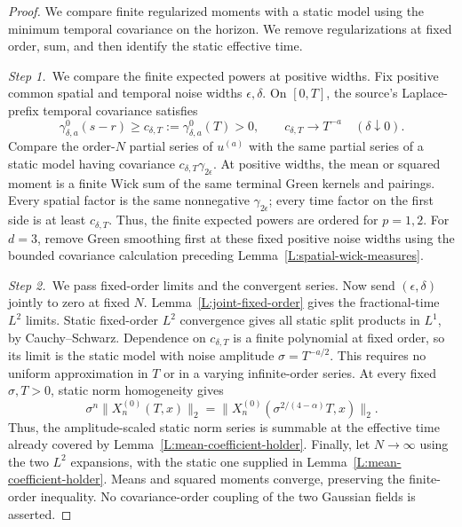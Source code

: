 \documentclass[12pt,oneside,openany]{book}
\numberwithin{equation}{section}
\theoremstyle{nogostyle}
\theoremstyle{definition}
\begin{document}
\begin{proof}
  We compare finite regularized moments with a static model using the minimum
  temporal covariance on the horizon. We remove regularizations at fixed
  order, sum, and then identify the static effective time.


  \medskip
  \noindent\textit{Step 1.~}We compare the finite expected powers at positive
  widths.
  Fix positive common spatial and temporal noise widths $\epsilon,\delta$. On
  $[0,T]$, the source's Laplace-prefix temporal covariance satisfies
  \[
    \gamma_{\delta,a}^0(s-r)\ge c_{\delta,T}:=
    \gamma_{\delta,a}^0(T)>0,\qquad
    c_{\delta,T}\longrightarrow T^{-a}\quad(\delta\downarrow0).
  \]
  Compare the order-$N$ partial series of $u^{(a)}$ with the same partial series
  of a static model having covariance $c_{\delta,T}\gamma_{2\epsilon}$. At
  positive widths, the mean or squared moment is a finite Wick sum of the same
  terminal Green kernels and pairings. Every spatial factor is the same
  nonnegative $\gamma_{2\epsilon}$; every time factor on the first side is at
  least $c_{\delta,T}$. Thus, the finite expected powers are ordered for $p =
  1,2$. For $d = 3$, remove Green smoothing first at these fixed positive noise
  widths using the bounded covariance calculation preceding
  Lemma~\ref{L:spatial-wick-measures}.


  \medskip
  \noindent\textit{Step 2.~}We pass fixed-order limits and the convergent
  series.
  Now send $(\epsilon,\delta)$ jointly to zero at fixed $N$.
  Lemma~\ref{L:joint-fixed-order} gives the fractional-time $L^2$ limits. Static
  fixed-order $L^2$ convergence gives all static split products in $L^1$, by
  Cauchy--Schwarz. Dependence on $c_{\delta,T}$ is a finite polynomial at fixed
  order, so its limit is the static model with noise amplitude $\sigma =
  T^{-a/2}$. This requires no uniform approximation in $T$ or in a varying
  infinite-order series. At every fixed $\sigma,T > 0$, static norm homogeneity
  gives
  \[
    \sigma^n\|X_n^{(0)}(T,x)\|_2
    =\|X_n^{(0)}(\sigma^{2/(4-\alpha)}T,x)\|_2.
  \]
  Thus, the amplitude-scaled static norm series is summable at the effective
  time already covered by Lemma~\ref{L:mean-coefficient-holder}. Finally, let $N
  \to \infty$ using the two $L^2$ expansions, with the static one supplied in
  Lemma~\ref{L:mean-coefficient-holder}. Means and squared moments converge,
  preserving the finite-order inequality. No covariance-order coupling of the
  two Gaussian fields is asserted.



\end{proof}
\end{document}
